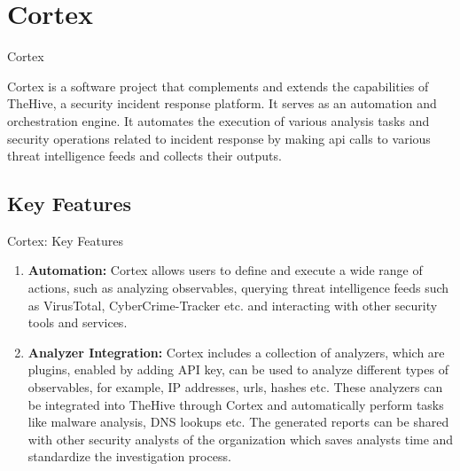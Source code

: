 \section{Cortex}
\begin{frame}{Cortex}
\begin{justify}
            Cortex is a software project that complements and extends the capabilities of TheHive, a security incident response platform. It serves as an automation and orchestration engine. It automates the execution of various analysis tasks and security operations related to incident response by making api calls to various threat intelligence feeds and collects their outputs.
\end{justify}

\end{frame}

\subsection{Key Features}
\begin{frame}{Cortex: Key Features}
\begin{justify}
    \begin{enumerate}
    \item \begin{justify}
        \textbf{Automation:} Cortex allows users to define and execute a wide range of actions, such as analyzing observables, querying threat intelligence feeds such as VirusTotal, CyberCrime-Tracker etc. and interacting with other security tools and services.
    \end{justify}

    \item \begin{justify}
        \textbf{Analyzer Integration:} Cortex includes a collection of analyzers, which are plugins, enabled by adding API key, can be used to analyze different types of observables, for example, IP addresses, urls, hashes etc. These analyzers can be integrated into TheHive through Cortex and automatically perform tasks like malware analysis, DNS lookups etc. The generated reports can be shared with other security analysts of the organization which saves analysts time and standardize the investigation process.
    \end{justify}
\end{enumerate}
\end{justify}
\end{frame}
